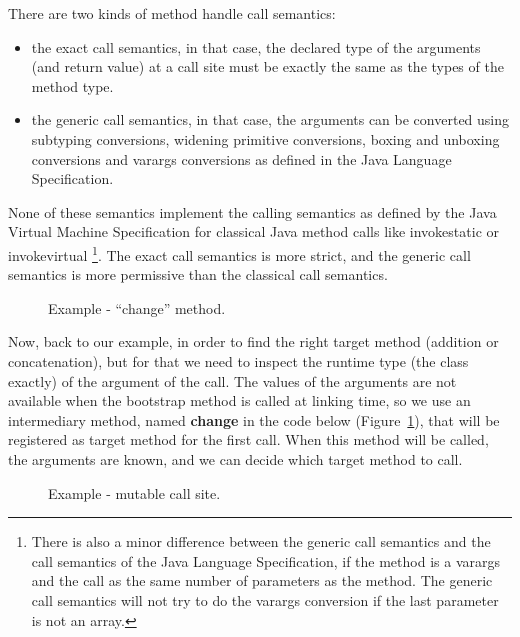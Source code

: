 \documentclass{sig-alternate}
\begin{document}
      There are two kinds of method handle call semantics:
      \begin{itemize}
        \item the exact call semantics, in that case, the declared type of the arguments (and return value) at a call site
              must be exactly the same as the types of the method type.
        \item the generic call semantics, in that case, the arguments can be converted using subtyping conversions,
              widening primitive conversions, boxing and unboxing conversions and varargs conversions
              as defined in the Java Language Specification.
      \end{itemize}
      None of these semantics implement the calling semantics as defined by the Java Virtual Machine Specification
      for classical Java method calls like invokestatic or invokevirtual
      \footnote{There is also a minor difference between the generic call semantics and the call semantics of
        the Java Language Specification, if the method is a varargs and the call as the same number of parameters as the method.
        The generic call semantics will not try to do the varargs conversion if the last parameter is not an array.}.
      The exact call semantics is more strict, and the generic call semantics is more permissive than the classical call semantics.

      \begin{figure}[!ht]
        \centering \vspace{-1.5em}
        \caption{Example - ``change'' method.}\vspace{-.7em}
        \label{fooCHANGE}
      \end{figure}

      Now, back to our example, in order to find the right target method (addition or concatenation),
      but for that we need to inspect the runtime type (the class exactly) of the argument of the call.
      The values of the arguments are not available when the bootstrap method is called at linking time,
      so we use an intermediary method, named {\bf change} in the code below (Figure~\ref{fooCHANGE}),
      that will be registered as target method for the first call.
      When this method will be called, the arguments are known, and we can decide which target method to call.

      \begin{figure}[!ht]
        \centering \vspace{-1.5em}
        \caption{Example - mutable call site.}\vspace{-1.5em}
        \label{fooMCS}
      \end{figure}
\end{document}
